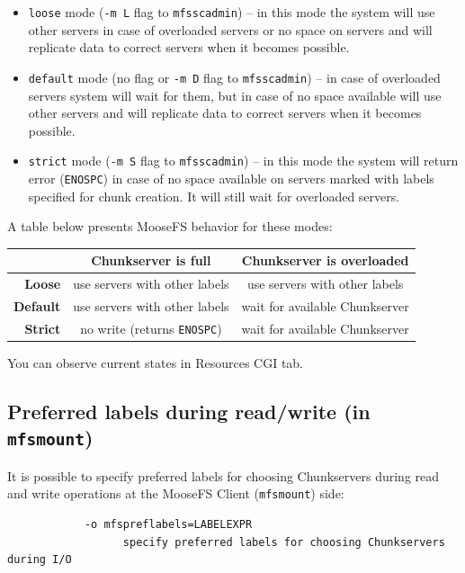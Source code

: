\documentclass[a4paper,11pt,english]{report}
\def\code#1{\texttt{#1}}
\begin{document}
			\begin{itemize}
				\item \code{loose} mode (\code{-m L} flag to \code{mfsscadmin}) -- in this mode the system will use other servers in case of overloaded servers or no space on servers and will replicate data to correct servers when it becomes possible.
				\item \code{default} mode (no flag or \code{-m D} flag to \code{mfsscadmin}) -- in case of overloaded servers system will wait for them, but in case of no space available will use other servers and will replicate data to correct servers when it becomes possible.
				\item \code{strict} mode (\code{-m S} flag to \code{mfsscadmin}) -- in this mode the system will return error (\code{ENOSPC}) in case of no space available on servers marked with labels specified for chunk creation. It will still wait for overloaded servers.
			\end{itemize}
			
			\bigskip
			A table below presents MooseFS behavior for these modes:
			\bigskip
			
			\begin{tabular}{r|c|c}
									& \textbf{Chunkserver is full}		& \textbf{Chunkserver is overloaded} \\
				\hline
				\textbf{Loose}		& use servers with other labels		& use servers with other labels \\
				\hline
				\textbf{Default}		& use servers with other labels 		& wait for available Chunkserver \\
				\hline
				\textbf{Strict}		& no write (returns \code{ENOSPC})	& wait for available Chunkserver \\
			\end{tabular}
			\bigskip
			
			You can observe current states in Resources CGI tab.
	
			\subsection{Preferred labels during read/write (in \code{mfsmount})}
			It is possible to specify preferred labels for choosing Chunkservers during read and write operations at the MooseFS Client (\code{mfsmount}) side:
			
			\begin{lstlisting}
			-o mfspreflabels=LABELEXPR
	              specify preferred labels for choosing Chunkservers during I/O
			\end{lstlisting}
			
\end{document}
